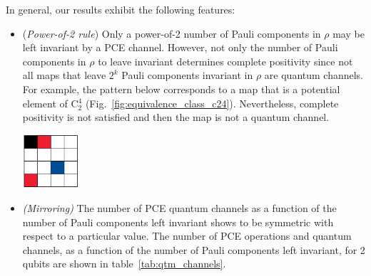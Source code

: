 \documentclass[11pt,dvipsnames]{article} %
\newcommand{\fref}[1]{fig.~\ref{#1}}
\newcommand{\tref}[1]{table~\ref{#1}}
\newcommand{\Fref}[1]{Fig.~\ref{#1}}
\newcommand{\1}{\mathds{1}}
\begin{document}
In general, our results exhibit the following features:
\begin{itemize}
\item (\textit{Power-of-2 rule})
Only a power-of-2 number of Pauli components in $\rho$ 
may be left invariant by a PCE channel. 
However, not only the number of Pauli components in $\rho$ 
to leave invariant determines complete positivity since
not all maps that leave $2^{k}$ Pauli components invariant in $\rho$
are quantum channels. For example, the pattern below corresponds 
to a map that is a potential element of C${}_2^4$ (\Fref{fig:equivalence_class_c24}).
Nevertheless, complete positivity is not satisfied 
and then the map is not a quantum channel. 
\begin{center}
	\includegraphics[height=2cm]{not-cc}
\end{center}

\item \textit{(Mirroring)}
The number of PCE quantum channels as a function of the number of Pauli 
components left invariant shows to be symmetric with respect to a
particular value. 
The number of PCE operations and quantum channels,
as a function of the number of Pauli components left invariant, 
for 2 qubits are shown in \tref{tab:qtm_channels}.

%


\end{itemize}
\end{document}
